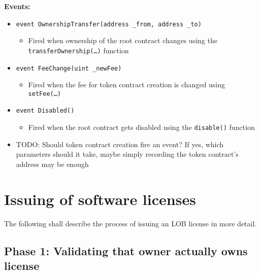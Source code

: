 \documentclass[a4paper]{article}
\newcommand{\todo}[1]{\textsf{TODO: #1}}
\begin{document}
\textbf{Events:}

\begin{itemize}
  \item \texttt{event OwnershipTransfer(address \_from, address \_to)}
  \begin{itemize}
    \item Fired when ownership of the root contract changes using the \texttt{transferOwnership(…)} function
  \end{itemize}
  
  \item \texttt{event FeeChange(uint \_newFee)}
  \begin{itemize}
    \item Fired when the fee for token contract creation is changed using \texttt{setFee(…)}
  \end{itemize}
  
  \item \texttt{event Disabled()}
  \begin{itemize}
    \item Fired when the root contract gets disabled using the \texttt{disable()} function
  \end{itemize}
  
  \item \todo{Should token contract creation fire an event? If yes, which parameters should it take, maybe simply recording the token contract's address may be enough}
\end{itemize}

\section{Issuing of software licenses}
\label{ch:licenseIssuing}

The following shall describe the process of issuing an LOB license in more detail. 

\subsection{Phase 1: Validating that owner actually owns license}
\end{document}
